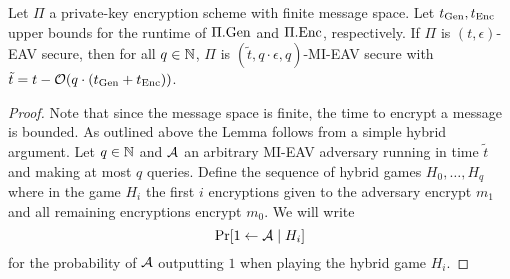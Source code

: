 \begin{lemma} \label{lemma:mi-eav-from-eav}
	Let $\Pi$ a private-key encryption scheme with finite message space. Let $t_{\mathrm{Gen}}, t_{\mathrm{Enc}}$ upper bounds for the runtime of $\Pi.\mathrm{Gen}$ and $\Pi.\mathrm{Enc}$, respectively. If $\Pi$ is $(t, \epsilon)$-EAV secure, then for all $q \in \mathbb{N}$, $\Pi$ is $(\tilde{t}, q \cdot \epsilon, q)$-MI-EAV secure with $\tilde{t} = t - \mathcal{O}(q \cdot (t_{\mathrm{Gen}} + t_{\mathrm{Enc}}))$.
\end{lemma}
\begin{proof} Note that since the message space is finite, the time to encrypt a message is bounded. As outlined above the Lemma follows from a simple hybrid argument. Let $q \in \mathbb{N}$ and $\mathcal{A}$ an arbitrary MI-EAV adversary running in time $\tilde{t}$ and making at most $q$ queries. Define the sequence of hybrid games $H_0, \ldots, H_q$ where in the game $H_i$ the first $i$ encryptions given to the adversary encrypt $m_1$ and all remaining encryptions encrypt $m_0$. We will write
	\[
		\pr{1 \from \adv \mid H_i}
	\]
	for the probability of $\mathcal{A}$ outputting $1$ when playing the hybrid game $H_i$.


\end{proof}
